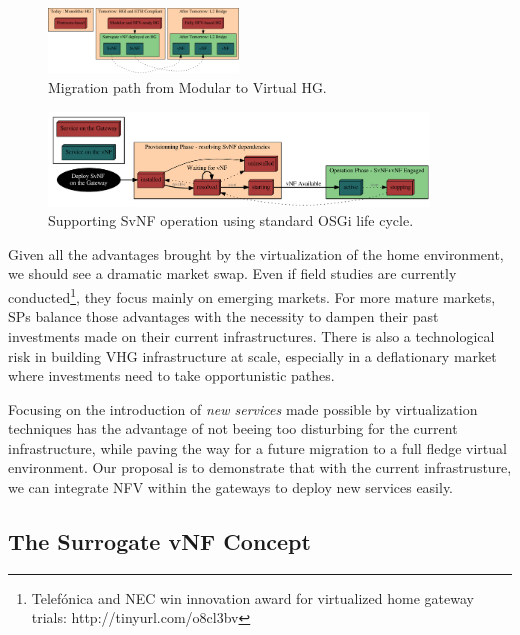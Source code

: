\begin{figure}
  \begin{center}
    \includegraphics[width=0.45\textwidth]{fig/migrationPath.pdf}
  \end{center}
  \caption{ Migration path from Modular to Virtual HG.
    \label{fig:migration}
  }
\end{figure}	

\begin{figure}
	
	\center

	\includegraphics[width=0.90\textwidth]{fig/osgi.pdf}
	\caption{ Supporting SvNF operation using standard OSGi life cycle.
    \label{fig:osgisvnf}
    }

\end{figure}
	   

Given all the advantages brought by the virtualization of the home environment, we should see a dramatic market swap.
Even if field studies are currently conducted\footnote{Telefónica and NEC win innovation award for virtualized home gateway trials: http://tinyurl.com/o8cl3bv}, they focus mainly on emerging markets.
For more mature markets, SPs balance those advantages with the necessity to dampen their past investments made on their current infrastructures.
There is also a technological risk in building VHG infrastructure at scale, especially in a deflationary market where investments need to take opportunistic pathes. 

Focusing on the introduction of \textit{new services} made possible by virtualization techniques has the advantage of not beeing too disturbing for the current infrastructure, while paving the way for a future migration to a full fledge virtual environment. Our proposal is to demonstrate that with the current infrastrusture, we can integrate NFV within the gateways to deploy new services easily.

\subsection{The Surrogate vNF Concept}





